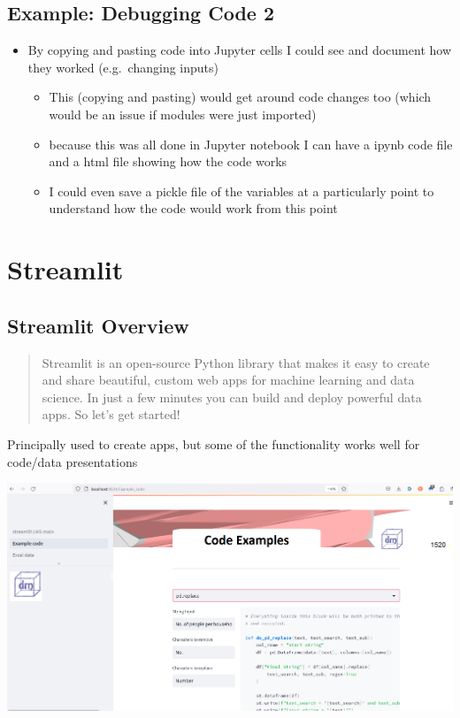 \documentclass[
  letterpaper,
  DIV=11,
  numbers=noendperiod]{scrartcl}
\providecommand{\tightlist}{%
  \setlength{\itemsep}{0pt}\setlength{\parskip}{0pt}}\usepackage{longtable,booktabs,array}
\begin{document}
\hypertarget{example-debugging-code-2}{%
\subsection{Example: Debugging Code 2}\label{example-debugging-code-2}}

\begin{itemize}
\tightlist
\item
  By copying and pasting code into Jupyter cells I could see and
  document how they worked (e.g.~changing inputs)

  \begin{itemize}
  \tightlist
  \item
    This (copying and pasting) would get around code changes too (which
    would be an issue if modules were just imported)
  \item
    because this was all done in Jupyter notebook I can have a ipynb
    code file and a html file showing how the code works
  \item
    I could even save a pickle file of the variables at a particularly
    point to understand how the code would work from this point
  \end{itemize}
\end{itemize}

\hypertarget{streamlit}{%
\section{Streamlit}\label{streamlit}}

\hypertarget{streamlit-overview}{%
\subsection{Streamlit Overview}\label{streamlit-overview}}

\begin{quote}
Streamlit is an open-source Python library that makes it easy to create
and share beautiful, custom web apps for machine learning and data
science. In just a few minutes you can build and deploy powerful data
apps. So let's get started!
\end{quote}

Principally used to create apps, but some of the functionality works
well for code/data presentations

\includegraphics{ghtop_images/streamlit_eg.png}
\end{document}
